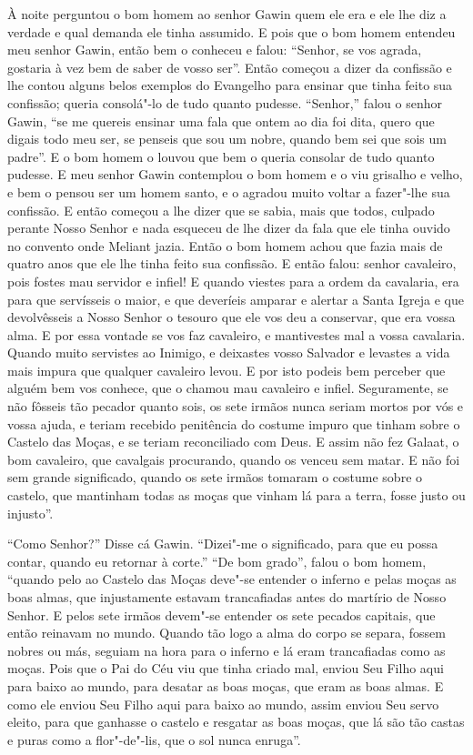 À noite perguntou o bom homem ao senhor Gawin quem ele era e ele lhe diz a
verdade e qual demanda ele tinha assumido. E pois que o bom homem entendeu meu
senhor Gawin,  então bem o conheceu e falou: “Senhor, se vos agrada,
gostaria à vez bem de saber de vosso ser”. Então começou a dizer da confissão e
lhe contou alguns belos exemplos do Evangelho para ensinar que tinha feito sua
confissão; queria consolá"-lo de tudo quanto pudesse. “Senhor,” falou o senhor
Gawin, ``se me quereis ensinar uma fala que ontem ao dia foi dita, quero que
digais todo meu ser, se penseis que sou um nobre, quando bem sei que sois um
padre”.  E o bom homem o louvou que bem o queria consolar de tudo quanto
pudesse. E meu senhor Gawin  contemplou o bom homem e o viu grisalho e
velho, e bem o pensou ser um homem santo, e o agradou muito voltar a fazer"-lhe
sua confissão. E então começou a lhe dizer que se sabia, mais que todos, culpado
perante Nosso Senhor e nada esqueceu de lhe dizer da fala que ele tinha ouvido
no convento onde Meliant jazia. Então o bom homem achou que fazia mais de
quatro anos que ele lhe tinha feito sua confissão. E então falou: senhor
cavaleiro, pois fostes mau servidor e infiel! E quando viestes para a ordem da
cavalaria, era para que servísseis o maior, e que deveríeis amparar e alertar a
Santa Igreja e que devolvêsseis a Nosso Senhor o tesouro que ele vos deu a
conservar, que era vossa alma. E por essa vontade se vos faz cavaleiro, e
mantivestes mal a vossa cavalaria. Quando muito servistes ao Inimigo, e
deixastes vosso Salvador e levastes a vida mais impura que qualquer cavaleiro
levou. E por isto podeis bem perceber que alguém bem vos conhece, que o chamou
mau cavaleiro e infiel. Seguramente, se não fôsseis tão pecador quanto sois, os
sete irmãos nunca seriam mortos por vós e vossa ajuda, e teriam recebido
penitência do costume impuro que tinham sobre o Castelo das Moças, e se teriam
reconciliado com Deus. E assim não fez Galaat, o bom cavaleiro, que cavalgais
procurando, quando os venceu sem matar. E não foi sem grande significado,
quando os sete irmãos tomaram o costume sobre o castelo, que mantinham todas as
moças que vinham lá para a terra, fosse justo ou injusto”.  

“Como Senhor?” Disse cá Gawin. ``Dizei"-me o significado, para que eu possa contar,
quando eu retornar à corte.'' “De bom grado”, falou o bom homem, “quando pelo ao
Castelo das Moças deve"-se entender o inferno e pelas moças as boas almas, que
injustamente estavam trancafiadas antes do martírio de Nosso Senhor. E pelos
sete irmãos devem"-se entender os sete pecados capitais, que então reinavam no
mundo. Quando tão logo a alma do corpo se separa, fossem nobres ou más, seguiam
na hora para o inferno e lá eram trancafiadas como as moças. Pois que o Pai do
Céu viu que tinha criado mal, enviou Seu Filho aqui para baixo ao mundo, para
desatar as boas moças, que eram as boas almas. E como ele enviou Seu Filho aqui
para baixo ao mundo, assim enviou Seu servo eleito, para que ganhasse o castelo
e resgatar as boas moças, que lá são tão castas e puras como a flor"-de"-lis, que
o sol nunca enruga”. 

